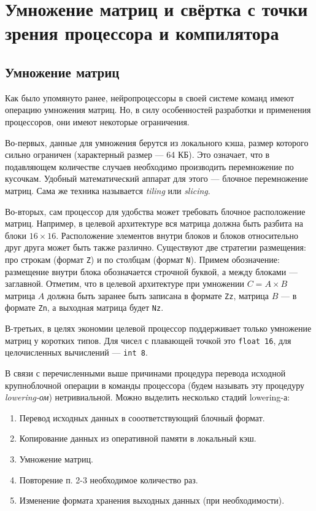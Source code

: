 \section{Умножение матриц и свёртка с точки зрения процессора и компилятора}
\label{sec:Chapter3} 

\subsection{Умножение матриц}

Как было упомянуто ранее, нейропроцессоры в своей системе команд имеют
операцию умножения матриц. Но, в силу особенностей разработки и
применения процессоров, они имеют некоторые ограничения.

Во-первых, данные для умножения берутся из локального кэша, размер
которого сильно ограничен (характерный размер --- 64 КБ). Это означает,
что в подавляющем количестве случаев необходимо производить перемножение
по кусочкам. Удобный математический аппарат для этого --- блочное
перемножение матриц. Сама же техника называется \textit{tiling} или \textit{slicing}.

Во-вторых, сам процессор для удобства может требовать блочное расположение
матриц. Например, в целевой архитектуре вся матрица должна быть разбита
на блоки $16 \times 16$. Расположение элементов внутри блоков и блоков
относительно друг друга может быть также различно. Существуют две стратегии
размещения: про строкам (формат \texttt{Z}) и по столбцам (формат \texttt{N}).
Примем обозначение: размещение внутри блока обозначается строчной буквой, а
между блоками --- заглавной. Отметим, что в целевой архитектуре при умножении
$C = A \times B$ матрица $A$ должна быть заранее быть записана в формате \texttt{Zz},
матрица $B$ --- в формате \texttt{Zn}, а выходная матрица будет \texttt{Nz}.

В-третьих, в целях экономии целевой процессор поддерживает только умножение
матриц у коротких типов. Для чисел с плавающей точкой это \texttt{float 16},
для целочисленных вычислений --- \texttt{int 8}.

В связи с перечисленными выше причинами процедура перевода исходной
крупноблочной операции в команды процессора (будем называть эту процедуру
\textit{lowering-ом}) нетривиальной. Можно выделить несколько стадий lowering-а:

\begin{enumerate}
    \item Перевод исходных данных в сооответствующий блочный формат.
    \item Копирование данных из оперативной памяти в локальный кэш.
    \item Умножение матриц.
    \item Повторение п. 2-3 необходимое количество раз.
    \item Изменение формата хранения выходных данных (при необходимости).
\end{enumerate}

